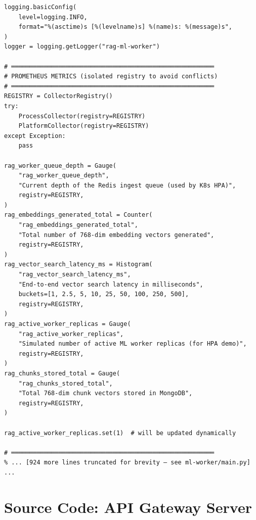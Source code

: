 \documentclass[12pt,a4paper]{report}
\begin{document}
\begin{lstlisting}
logging.basicConfig(
    level=logging.INFO,
    format="%(asctime)s [%(levelname)s] %(name)s: %(message)s",
)
logger = logging.getLogger("rag-ml-worker")

# ════════════════════════════════════════════════════════
# PROMETHEUS METRICS (isolated registry to avoid conflicts)
# ════════════════════════════════════════════════════════
REGISTRY = CollectorRegistry()
try:
    ProcessCollector(registry=REGISTRY)
    PlatformCollector(registry=REGISTRY)
except Exception:
    pass

rag_worker_queue_depth = Gauge(
    "rag_worker_queue_depth",
    "Current depth of the Redis ingest queue (used by K8s HPA)",
    registry=REGISTRY,
)
rag_embeddings_generated_total = Counter(
    "rag_embeddings_generated_total",
    "Total number of 768-dim embedding vectors generated",
    registry=REGISTRY,
)
rag_vector_search_latency_ms = Histogram(
    "rag_vector_search_latency_ms",
    "End-to-end vector search latency in milliseconds",
    buckets=[1, 2.5, 5, 10, 25, 50, 100, 250, 500],
    registry=REGISTRY,
)
rag_active_worker_replicas = Gauge(
    "rag_active_worker_replicas",
    "Simulated number of active ML worker replicas (for HPA demo)",
    registry=REGISTRY,
)
rag_chunks_stored_total = Gauge(
    "rag_chunks_stored_total",
    "Total 768-dim chunk vectors stored in MongoDB",
    registry=REGISTRY,
)

rag_active_worker_replicas.set(1)  # will be updated dynamically

# ════════════════════════════════════════════════════════
% ... [924 more lines truncated for brevity — see ml-worker/main.py] ...
\end{lstlisting}

\section{Source Code: API Gateway Server}
\end{document}
